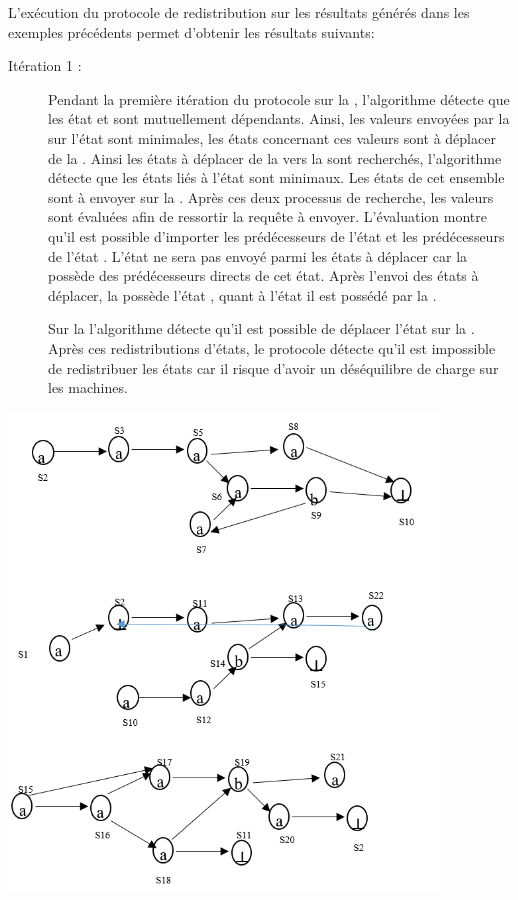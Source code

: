 \begin{Exemple}\label{ea5}
L'exécution du protocole de redistribution sur les résultats générés dans les exemples précédents permet d'obtenir  les résultats suivants:

\begin{description}
\item[Itération 1 :] Pendant la première itération du protocole sur la \mone{}, l'algorithme détecte que les état  et  sont mutuellement dépendants. Ainsi, les valeurs envoyées par la \mtwo{} sur l'état  sont minimales, les états concernant ces valeurs sont à déplacer de la \mtwo{}. Ainsi les états à déplacer de la \mone{} vers la \mtwo{} sont recherchés, l'algorithme détecte que les états liés à l'état  sont minimaux. Les états de cet ensemble sont à envoyer sur la \mtwo{}. Après ces deux processus de recherche, les valeurs sont évaluées afin de ressortir la requête à envoyer. L'évaluation montre qu'il est possible d'importer les prédécesseurs de l'état  et les prédécesseurs de  l'état .
L'état  ne sera pas envoyé parmi les états à déplacer car la \mtree{} possède des prédécesseurs directs de cet état. Après l'envoi des états à déplacer, la \mone{} possède l'état , quant à l'état  il est possédé par la \mtwo{}.


Sur la \mtree{} l'algorithme détecte qu'il est possible de déplacer l'état  sur la \mtwo{}.
   Après ces redistributions d'états, le protocole détecte qu'il est impossible de redistribuer les états car il risque d'avoir un déséquilibre de charge sur les machines.
   
\end{description}
\centering
	\includegraphics[height=5in]{img/Rskd.png}
	
\end{Exemple}